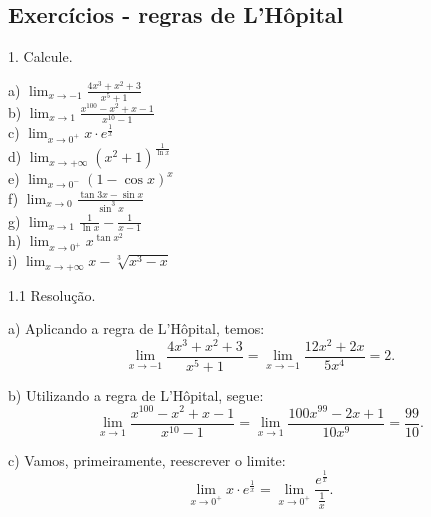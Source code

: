 \documentclass{article}
\begin{document}
{\begin{newpage}
\subsection{Exercícios - regras de L'Hôpital}
\par
\begin{flushleft}
1. Calcule.
\end{flushleft}
\begin{multicols}{3}
\hspace{-15pt}a) $\displaystyle{\lim_{x\to -1} \frac{4x^3 + x^2 + 3}{x^5 + 1}}$ \\
b) $\displaystyle{\lim_{x\to 1} \frac{x^{100} - x^2 + x - 1}{x^{10} - 1}}$ \\
c) $\displaystyle{\lim_{x\to 0^{+}} x\cdot e^{\frac{1}{x}}}$ \\
d) $\displaystyle{\lim_{x\to +\infty } (x^2 + 1)^{\frac{1}{\ln{x}}}}$ \\
e) $\displaystyle{\lim_{x\to 0^{-}} (1 - \cos{x})^{x}}$ \\
f) $\displaystyle{\lim_{x\to 0} \frac{\tan{3x} - \sin{x}}{\sin^{3}{x}}}$\\ 
g) $\displaystyle{\lim_{x\to 1} \frac{1}{\ln{x}} - \frac{1}{x-1}}$\\
h) $\displaystyle{\lim_{x\to 0^{+}} x^{\tan{x^2}}}$\\
i) $\displaystyle{\lim_{x\to +\infty } x - \sqrt[3]{x^3 - x}}$\end{multicols}
\par
\vspace{0.3cm}
\begin{flushleft}
1.1 Resolução.
\end{flushleft}
\par
a) Aplicando a regra de L'Hôpital, temos:
\begin{equation*} \displaystyle{\lim_{x\to -1} \frac{4x^3 + x^2 + 3}{x^5 + 1} = \lim_{x\to -1} \frac{12x^2 + 2x}{5x^4} = 2 .}\end{equation*}
\par
\vspace{0.3cm}
b) Utilizando a regra de L'Hôpital, segue:
\begin{equation*} \displaystyle{\lim_{x\to 1} \frac{x^{100} - x^2 + x - 1}{x^{10} - 1} = \lim_{x\to 1} \frac{100x^{99} -2x + 1}{10x^{9}} = \frac{99}{10} .}\end{equation*}
\par
\vspace{0.3cm}
c) Vamos, primeiramente, reescrever o limite:
\begin{equation*} \displaystyle{\lim_{x\to 0^{+}} x\cdot e^{\frac{1}{x}} = \lim_{x\to 0^{+}} \frac{e^{\frac{1}{x}}}{\frac{1}{x}} }.\end{equation*}

\end{newpage}}
\end{document}
